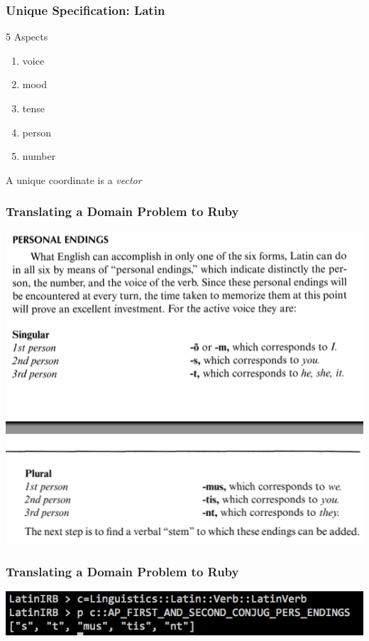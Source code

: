 \documentclass[slidestop,compress,mathserif]{beamer}
\begin{document}
\begin{frame}
	\frametitle{Unique Specification:  Latin}
	5 Aspects
	\begin{enumerate}
		\item voice
		\pause
		\item mood
		\pause
		\item tense
		\pause
		\item person
		\pause
		\item number
		\pause
	\end{enumerate}
	\vskip 0.5cm
	A unique coordinate is a \emph{vector}
\end{frame}

\begin{frame}
	\frametitle{Translating a Domain Problem to Ruby} 
	\includegraphics[scale=0.45]{img/conj_how_1.png}
\end{frame}

\begin{frame}
	\frametitle{Translating a Domain Problem to Ruby} 
	\includegraphics[scale=0.45]{img/conj_how_1b.png}
\end{frame}
\end{document}
